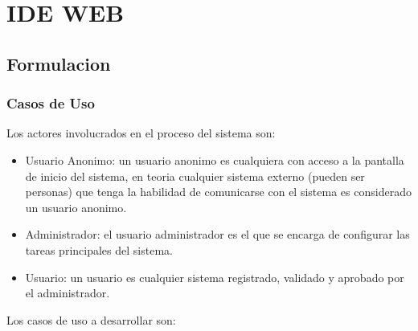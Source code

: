 \section{IDE WEB}
\subsection{Formulacion}
\subsubsection{Casos de Uso}

Los actores involucrados en el proceso del sistema son:

\begin{itemize}

	\item{Usuario Anonimo:} un usuario anonimo es cualquiera con acceso a la pantalla de inicio del sistema, en teoria cualquier sistema externo (pueden ser personas) que tenga la habilidad de comunicarse con el sistema es considerado un usuario anonimo.
	
	\item{Administrador:} el usuario administrador es el que se encarga de configurar las tareas principales del sistema.
	
	\item{Usuario:} un usuario es cualquier sistema registrado, validado y aprobado por el administrador.

\end{itemize}

Los casos de uso a desarrollar son:

